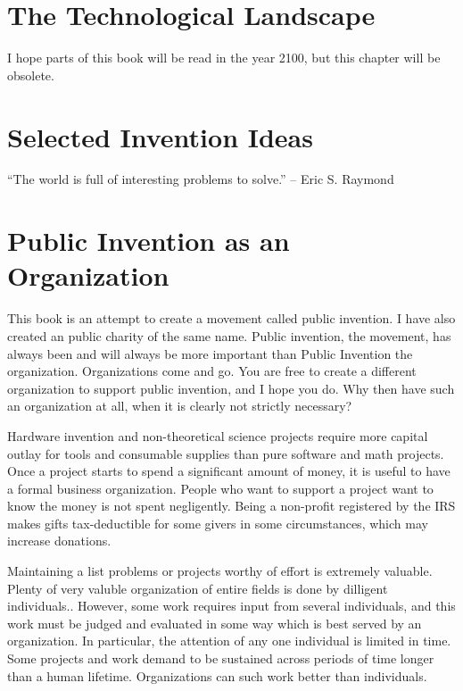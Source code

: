 \documentclass[
	fontsize=10pt, %
	twoside=false, %
	secnumdepth=1, %
]{kaobook}
\begin{document}
\chapter{The Technological Landscape}

I hope parts of this book will be read in the year 2100, but this chapter
will be obsolete.

\chapter{Selected Invention Ideas}

``The world is full of interesting problems to solve.'' -- Eric S. Raymond


\chapter{Public Invention as an Organization}

This book is an attempt to create a movement called public invention.
I have also created an public charity of the same name.
Public invention, the movement, has always been and will always be more important than Public Invention the organization.
Organizations come and go.
You are free to create a different organization to support public invention, and I hope you do.
Why then have such an organization at all, when it is clearly not strictly necessary?

Hardware invention and non-theoretical science projects require more capital outlay
for tools and consumable supplies than pure software and math projects.
Once a project starts to spend a significant amount of money, it is useful to have a formal business organization.
People who want to support a project want to know the money is not spent negligently.
Being a non-profit registered by the IRS makes gifts tax-deductible for some givers in some circumstances,
which may increase donations.


Maintaining a list problems or projects worthy of effort is extremely valuable.
Plenty of very valuble organization of entire fields is done by dilligent individuals..
However, some work requires input from several individuals, and this work must be judged and evaluated
in some way which is best served by an organization.
In particular, the attention of any one
individual is limited in time.
Some projects and work demand to be sustained across periods of time longer than a human lifetime.
Organizations can such work better than individuals.
\end{document}
